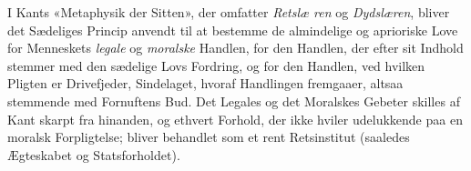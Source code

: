 \documentclass[12pt,a4paper]{book}
\begin{document}
I Kants «Metaphysik der Sitten», der omfatter \emph{Retslæ\-%
ren} og \emph{Dydslæren}, bliver det Sædeliges Princip anvendt til
at bestemme de almindelige og aprioriske Love for Menneskets
\emph{legale} og \emph{moralske} Handlen, for den Handlen, der efter sit
Indhold stemmer med den sædelige Lovs Fordring, og for den
Handlen, ved hvilken Pligten er Drivefjeder, Sindelaget, hvoraf
Handlingen fremgaaer, altsaa stemmende med Fornuftens Bud.
Det Legales og det Moralskes Gebeter skilles af Kant skarpt
fra hinanden, og ethvert Forhold, der ikke hviler udelukkende
paa en moralsk Forpligtelse; bliver behandlet som et rent
Retsinstitut (saaledes Ægteskabet og Statsforholdet).
\end{document}
